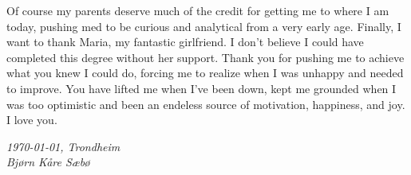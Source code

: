 Of course my parents deserve much of the credit for getting me to where I am today, pushing med to be curious and analytical from a very early age. Finally, I want to thank Maria, my fantastic girlfriend. I don't believe I could have completed this degree without her support. Thank you for pushing me to achieve what you knew I could do, forcing me to realize when I was unhappy and needed to improve. You have lifted me when I've been down, kept me grounded when I was too optimistic and been an endeless source of motivation, happiness, and joy. I love you.

\emph{
    \today, Trondheim \\
    Bjørn Kåre Sæbø
}